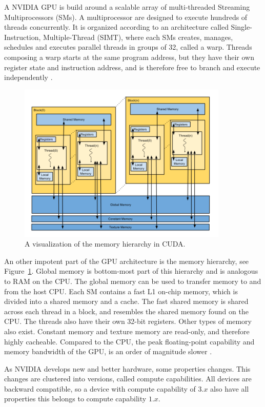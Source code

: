 A NVIDIA GPU is build around a scalable array of multi-threaded Streaming Multiprocessors (SMs). A multiprocessor are designed to execute hundreds of threads concurrently. It is organized according to an architecture called Single-Instruction, Multiple-Thread (SIMT), where each SMs creates, manages, schedules and executes parallel threads in groups of 32, called a warp. Threads composing a warp starts at the same program address, but they have their own register state and instruction address, and is therefore free to branch and execute independently \citep{cuda_programming_guide}.

\begin{figure}[ht!]
\centering
\includegraphics[width=100mm]{../gfx/memory_hierarchy.png}
\caption{A visualization of the memory hierarchy in CUDA.}
\label{fig:memory_hierachy}
\end{figure}

An other impotent part of the GPU architecture is the memory hierarchy, see Figure~\ref{fig:memory_hierachy}. Global memory is bottom-most part of this hierarchy and is analogous to RAM on the CPU\@. The global memory can be used to transfer memory to and from the host CPU\@. Each SM contains a fast L1 on-chip memory, which is divided into a shared memory and a cache. The fast shared memory is shared across each thread in a block, and resembles the shared memory found on the CPU\@. The threads also have their own 32-bit registers. Other types of memory also exist. Constant memory and texture memory are read-only, and therefore highly cacheable. Compared to the CPU, the peak floating-point capability and memory bandwidth of the GPU, is an order of magnitude slower \citep{Liangcu}.

As NVIDIA develops new and better hardware, some properties changes. This changes are clustered into versions, called compute capabilities. All devices are backward compatible, so a device with compute capability of $3.x$ also have all properties this belongs to compute capability $1.x$.  

